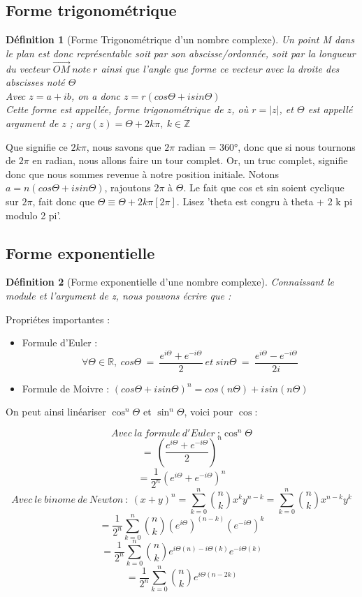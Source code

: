\documentclass{article}
\newtheorem{defi}{Définition}
\begin{document}
\subsection{Forme trigonométrique}
\begin{defi}[Forme Trigonométrique d'un nombre complexe]
Un point M dans le plan est donc représentable soit par son abscisse/ordonnée, soit par la longueur du vecteur $\overrightarrow{OM}~note~r$ ainsi que l'angle que forme ce vecteur avec la droite des abscisses noté $\Theta$\\
Avec $z = a + ib$, on a donc $z = r(cos\Theta + isin\Theta)$\\
Cette forme est appellée, forme trigonométrique de $z$, où $r = |z|$, et $\Theta$ est appellé argument de $z$ ; $arg(z) = \Theta + 2k\pi,~k \in \mathbb{Z}$
\end{defi}
Que signifie ce $2k\pi$, nous savons que $2\pi$ radian = $360°$, donc que si nous tournons de $2\pi$ en radian, nous allons faire un tour complet. Or, un truc complet, signifie donc que nous sommes revenue à notre position initiale. Notons $a = n(cos\Theta + isin\Theta)$, rajoutons $2\pi$ à $\Theta$. Le fait que cos et sin soient cyclique sur $2\pi$, fait donc que $\Theta\equiv\Theta+2k\pi [2\pi]$. Lisez 'theta est congru à theta + 2 k pi modulo 2 pi'.

\subsection{Forme exponentielle}
\begin{defi}[Forme exponentielle d'une nombre complexe]
  Connaissant le module et l'argument de z, nous pouvons écrire que :\\

\end{defi}
Propriétes importantes :
\begin{itemize}
    \item Formule d'Euler : $$\forall \Theta \in \mathbb{R},~cos\Theta~=~\frac{e^{i\Theta}+e^{-i\Theta}}{2}~et~sin\Theta~=~\frac{e^{i\Theta}-e^{-i\Theta}}{2i}$$
    \item Formule de Moivre : $(cos\Theta+isin\Theta)^{n} = cos(n\Theta) + isin(n\Theta)$
\end{itemize}
On peut ainsi linéariser $\cos^{n}\Theta$ et $\sin^{n}\Theta$, voici pour $\cos$:

\begin{center}
  $$Avec~la~formule~d'Euler~:\cos^{n}\Theta$$
  $$=~(\frac{e^{i\Theta}+e^{-i\Theta}}{2})^{n}$$
  $$= \frac{1}{2^{n}}(e^{i\Theta}+e^{-i\Theta})^{n}$$
  $$Avec~le~binome~de~Newton~:~(x+y)^{n} = \sum_{k=0}^{n}{\binom{n}{k}x^{k}y^{n-k}} = \sum_{k=0}^{n}{\binom{n}{k}x^{n-k}y^{k}}$$
  $$= \frac{1}{2^{n}}\sum_{k=0}^{n}{\binom{n}{k}(e^{i\Theta})^{(n-k)}(e^{-i\Theta})^{k}}$$
  $$= \frac{1}{2^{n}}\sum_{k=0}^{n}{{\binom{n}{k}e^{i\Theta(n)-i\Theta(k)}e^{-i\Theta(k)}}}$$
  $$= \frac{1}{2^{n}}\sum_{k=0}^{n}{\binom{n}{k}e^{i\Theta(n-2k)}}$$
\end{center}
\end{document}

